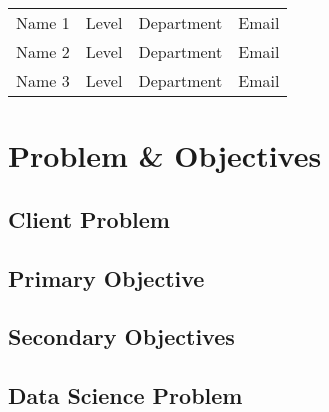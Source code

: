\documentclass[12pt]{article}
\begin{document}
\noindent\begin{tabular}{llll}
Name 1 & Level & Department & Email \\
Name 2 & Level & Department & Email \\
Name 3 & Level & Department & Email \\
\end{tabular}



\section*{Problem \& Objectives}


\subsection*{Client Problem}




\subsection*{Primary Objective}




\subsection*{Secondary Objectives}




\subsection*{Data Science Problem}

\end{document}
